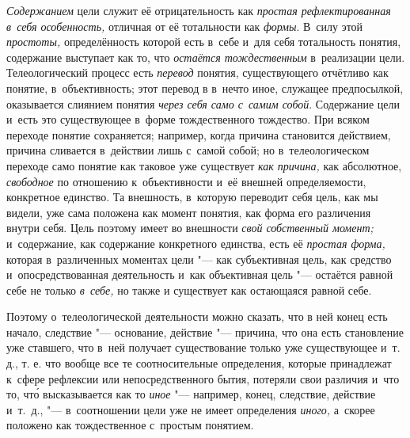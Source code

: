 {\em Содержанием} цели
служит её отрицательность как
{\em простая рефлектированная в~себя
особенность,} отличная от её тотальности как
{\em формы}. В~силу этой
{\em простоты,}
определённость которой есть в~себе и~для себя тотальность
понятия, содержание выступает как то, что
{\em остаётся тождественным}
в~реализации цели. Телеологический процесс есть
{\em перевод} понятия,
существующего отчётливо как понятие, в~объективность; этот перевод в
в~нечто иное, служащее предпосылкой, оказывается слиянием понятия
{\em через себя само с~самим собой}.
Содержание цели и~есть это существующее в~форме
тождественного тождество. При всяком переходе понятие сохраняется;
например, когда причина становится действием, причина сливается в~действии
лишь с~самой собой; но в~телеологическом переходе само понятие как таковое
уже существует {\em как причина,}
как абсолютное,
{\em свободное} по
отношению к~объективности и~её внешней определяемости, конкретное единство.
Та внешность, в~которую переводит себя цель, как мы видели, уже сама
положена как момент понятия, как форма его различения внутри себя. Цель
поэтому имеет во внешности {\em свой
собственный момент;} и~содержание, как содержание
конкретного единства, есть её
{\em простая форма,}
которая в~различенных моментах цели "--- как
субъективная цель, как средство и~опосредствованная деятельность и~как
объективная цель "--- остаётся равной себе не только
{\em в~себе,} но также и
существует как остающаяся равной себе.

Поэтому о~телеологической деятельности можно сказать, что в
ней конец есть начало, следствие "--- основание, действие
"--- причина, что она есть становление уже ставшего, что в~ней
получает существование только уже существующее и~т. д., т. е. что вообще
все те соотносительные определения, которые принадлежат к~сфере рефлексии
или непосредственного бытия, потеряли свои различия и~что то, чт\'{о}
высказывается как то
{\em иное} "--- например,
конец, следствие, действие и~т.~д., "--- в~соотношении цели уже
не имеет определения
{\em иного,} а~скорее
положено как тождественное с~простым понятием.

